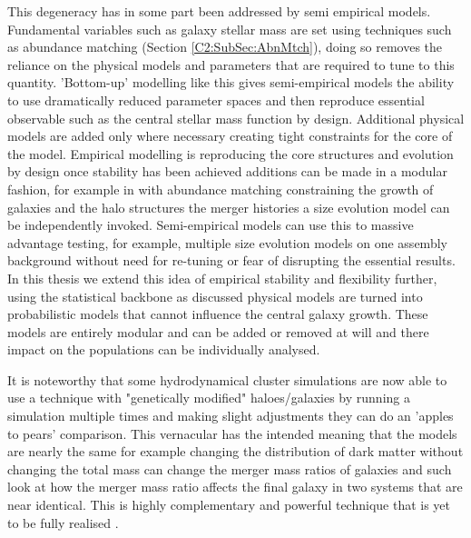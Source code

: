This degeneracy has in some part been addressed by semi empirical models. Fundamental variables such as galaxy stellar mass are set using techniques such as abundance matching (Section \ref{C2:SubSec:AbnMtch}), doing so removes the reliance on the physical models and parameters that are required to tune to this quantity. 'Bottom-up' modelling like this gives semi-empirical models the ability to use dramatically reduced parameter spaces and then reproduce essential observable such as the central stellar mass function by design. Additional physical models are added only where necessary creating tight constraints for the core of the model. Empirical modelling is reproducing the core structures and evolution
by design once stability has been achieved additions can be made in a modular fashion, for example in \citet{Shankar2014} with abundance matching constraining the growth of galaxies and the halo structures the merger histories a size evolution model can be independently invoked. Semi-empirical models can use this to massive advantage testing, for example, multiple size evolution models on one assembly background without need for re-tuning or fear of disrupting the essential results. In this thesis we extend this idea of empirical stability and flexibility further, using the statistical backbone as discussed physical models are turned into probabilistic models that cannot influence the central galaxy growth. These models are entirely modular and can be added or removed at will and there impact on the populations can be individually analysed. 

It is noteworthy that some hydrodynamical cluster simulations are now able to use a technique with "genetically modified" haloes/galaxies by running a simulation multiple times and making slight adjustments they can do an 'apples to pears' comparison. This vernacular has the intended meaning that the models are nearly the same for example changing the distribution of dark matter without changing the total mass can change the merger mass ratios of galaxies and such look at how the merger mass ratio affects the final galaxy in two systems that are near identical. This is highly complementary and powerful technique that is yet to be fully realised \cite{Rey2018QuadraticHistory}.

